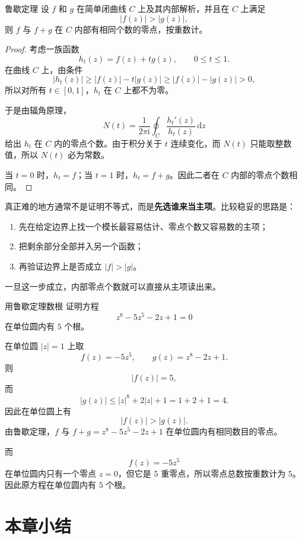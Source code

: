 \begin{dingli}{鲁歇定理}{}
设 $f$ 和 $g$ 在简单闭曲线 $C$ 上及其内部解析，并且在 $C$ 上满足
\[
    |f(z)|>|g(z)|,
\]
则 $f$ 与 $f+g$ 在 $C$ 内部有相同个数的零点，按重数计。
\end{dingli}

\begin{proof}
考虑一族函数
\[
    h_t(z)=f(z)+tg(z),\qquad 0\le t\le 1.
\]
在曲线 $C$ 上，由条件
\[
    |h_t(z)|
    \ge |f(z)|-t|g(z)|
    \ge |f(z)|-|g(z)|
    >0,
\]
所以对所有 $t\in[0,1]$，$h_t$ 在 $C$ 上都不为零。

于是由辐角原理，
\[
    N(t)=\frac{1}{2\pi \mathrm{i}}\oint_C \frac{h_t'(z)}{h_t(z)}\,\mathrm{d}z
\]
给出 $h_t$ 在 $C$ 内的零点个数。由于积分关于 $t$ 连续变化，而 $N(t)$ 只能取整数值，所以 $N(t)$ 必为常数。

当 $t=0$ 时，$h_t=f$；当 $t=1$ 时，$h_t=f+g$。因此二者在 $C$ 内部的零点个数相同。
\end{proof}

\begin{tishi}[鲁歇定理最常见的用法]
真正难的地方通常不是证明不等式，而是\textbf{先选谁来当主项}。比较稳妥的思路是：
\begin{enumerate}
    \item 先在给定边界上找一个模长最容易估计、零点个数又容易数的主项；
    \item 把剩余部分全部并入另一个函数；
    \item 再验证边界上是否成立 $|f|>|g|$。
\end{enumerate}
一旦这一步成立，内部零点个数就可以直接从主项读出来。
\end{tishi}

\begin{lizi}{用鲁歇定理数根}{}
证明方程
\[
    z^8-5z^5-2z+1=0
\]
在单位圆内有 $5$ 个根。

\begin{jie}
在单位圆 $|z|=1$ 上取
\[
    f(z)=-5z^5,\qquad g(z)=z^8-2z+1.
\]
则
\[
    |f(z)|=5,
\]
而
\[
    |g(z)|\le |z|^8+2|z|+1=1+2+1=4.
\]
因此在单位圆上有
\[
    |f(z)|>|g(z)|.
\]
由鲁歇定理，$f$ 与 $f+g=z^8-5z^5-2z+1$ 在单位圆内有相同数目的零点。

而
\[
    f(z)=-5z^5
\]
在单位圆内只有一个零点 $z=0$，但它是 $5$ 重零点，所以零点总数按重数计为 $5$。因此原方程在单位圆内有 $5$ 个根。
\end{jie}
\end{lizi}

\section{本章小结}

